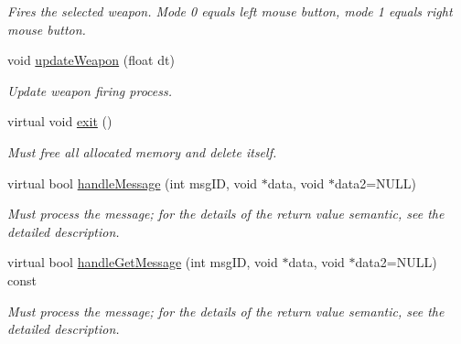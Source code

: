\begin{DoxyCompactItemize}
\begin{DoxyCompactList}\small\item\em \-Fires the selected weapon. \-Mode 0 equals left mouse button, mode 1 equals right mouse button. \end{DoxyCompactList}\item 
\hypertarget{classComponentCharacterController_aad1c6495c2a847b156bda7ca02f04860}{
void \hyperlink{classComponentCharacterController_aad1c6495c2a847b156bda7ca02f04860}{update\-Weapon} (float dt)}
\label{dd/d8a/classComponentCharacterController_aad1c6495c2a847b156bda7ca02f04860}

\begin{DoxyCompactList}\small\item\em \-Update weapon firing process. \end{DoxyCompactList}\item 
\hypertarget{classComponentCharacterController_aea2d483e910e4632dbaec17fb69a994f}{
virtual void \hyperlink{classComponentCharacterController_aea2d483e910e4632dbaec17fb69a994f}{exit} ()}
\label{dd/d8a/classComponentCharacterController_aea2d483e910e4632dbaec17fb69a994f}

\begin{DoxyCompactList}\small\item\em \-Must free all allocated memory and delete itself. \end{DoxyCompactList}\item 
virtual bool \hyperlink{classComponentCharacterController_aaaa328966ec25f292e45b9948dde2d28}{handle\-Message} (int msg\-I\-D, void $\ast$data, void $\ast$data2=\-N\-U\-L\-L)
\begin{DoxyCompactList}\small\item\em \-Must process the message; for the details of the return value semantic, see the detailed description. \end{DoxyCompactList}\item 
virtual bool \hyperlink{classComponentCharacterController_acd5417a4680dacdfc2b49620053ae9b2}{handle\-Get\-Message} (int msg\-I\-D, void $\ast$data, void $\ast$data2=\-N\-U\-L\-L) const 
\begin{DoxyCompactList}\small\item\em \-Must process the message; for the details of the return value semantic, see the detailed description. \end{DoxyCompactList}\end{DoxyCompactItemize}
